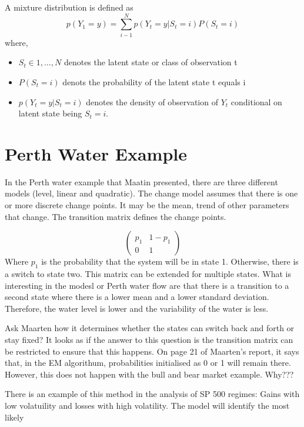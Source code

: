 \documentclass[12pt, a4paper, oneside]{article} %
\begin{document}
A mixture distribution is defined as 
\begin{equation}
p(Y_1 = y) = \sum_{i - 1}^N p(Y_t = y|S_t = i)P(S_t = i)
\end{equation}
where,
\begin{itemize}
\item $S_t \in {1, \dots, N}$ denotes the latent state or class of observation t
\item $P(S_t = i)$ denots the probability of the latent state t equals i 
\item $p(Y_t = y|S_t = i)$ denotes the density of observation of $Y_t$ conditional on latent state being $S_t = i$.
\end{itemize}
\section{Perth Water Example}

In the Perth water example that Maatin presented, there are three different models (level, linear and quadratic).  The change model assumes that there is one or more discrete change points.  It may be the mean, trend of other parameters that change. The transition matrix defines the change points.  

\begin{equation*}
\begin{pmatrix}
p_1 & 1 - p_1 \\
0 & 1
\end{pmatrix}
\end{equation*}
Where $p_1$ is the probability that the system will be in state 1.  Otherwise, there is a switch to state two.  This matrix can be extended for multiple states. What is interesting in the modesl or Perth water flow are that there is a transition to a second state where there is a lower mean and a lower standard deviation. Therefore, the water level is lower and the variability of the water is less. 

Ask Maarten how it determines whether the states can switch back and forth or stay fixed?  It looks as if the answer to this question is the transition matrix can be restricted to ensure that this happens.  On page 21 of Maarten's report, it says that, in the EM algorithum, probabilities initialised as 0 or 1 will remain there.  However, this does not happen with the bull and bear market example.  Why???

There is an example of this method in the analysis of SP 500 regimes: Gains with low volatuility and losses with high volatility. The model will identify the most likely 
\end{document}
